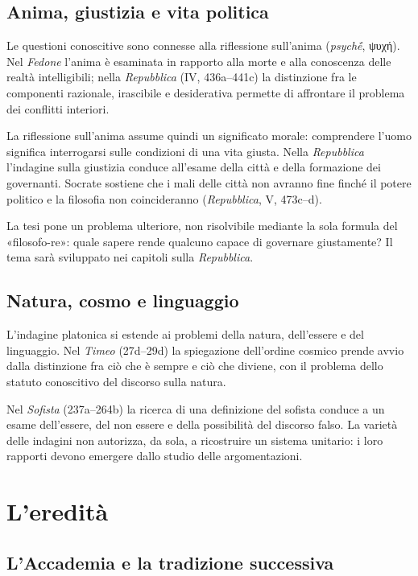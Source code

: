\subsection{Anima, giustizia e vita politica}

Le questioni conoscitive sono connesse alla riflessione sull'anima (\emph{psychḗ}, ψυχή). Nel \emph{Fedone} l'anima è esaminata in rapporto alla morte e alla conoscenza delle realtà intelligibili; nella \emph{Repubblica} (IV, 436a--441c) la distinzione fra le componenti razionale, irascibile e desiderativa permette di affrontare il problema dei conflitti interiori.

La riflessione sull'anima assume quindi un significato morale: comprendere l'uomo significa interrogarsi sulle condizioni di una vita giusta. Nella \emph{Repubblica} l'indagine sulla giustizia conduce all'esame della città e della formazione dei governanti. Socrate sostiene che i mali delle città non avranno fine finché il potere politico e la filosofia non coincideranno (\emph{Repubblica}, V, 473c--d).

La tesi pone un problema ulteriore, non risolvibile mediante la sola formula del «filosofo-re»: quale sapere rende qualcuno capace di governare giustamente? Il tema sarà sviluppato nei capitoli sulla \emph{Repubblica}.

\subsection{Natura, cosmo e linguaggio}

L'indagine platonica si estende ai problemi della natura, dell'essere e del linguaggio. Nel \emph{Timeo} (27d--29d) la spiegazione dell'ordine cosmico prende avvio dalla distinzione fra ciò che è sempre e ciò che diviene, con il problema dello statuto conoscitivo del discorso sulla natura.

Nel \emph{Sofista} (237a--264b) la ricerca di una definizione del sofista conduce a un esame dell'essere, del non essere e della possibilità del discorso falso. La varietà delle indagini non autorizza, da sola, a ricostruire un sistema unitario: i loro rapporti devono emergere dallo studio delle argomentazioni.

\section{L'eredità}

\subsection{L'Accademia e la tradizione successiva}

